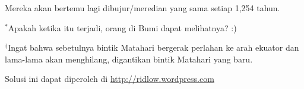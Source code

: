 \documentclass[11pt,fleqn]{exam}
\begin{document}
\begin{questions}
Mereka akan bertemu lagi dibujur/meredian yang sama setiap 1,254 tahun. 

$^\ast$Apakah ketika itu terjadi, orang di Bumi dapat melihatnya? :)

$^\dagger$Ingat bahwa sebetulnya bintik Matahari bergerak perlahan ke arah ekuator dan lama-lama akan menghilang, digantikan bintik Matahari yang baru.


\end{questions}



\vspace{5cm}
\begin{flushright}
Solusi ini dapat diperoleh di \url{http://ridlow.wordpress.com}
\end{flushright}
\end{document}
